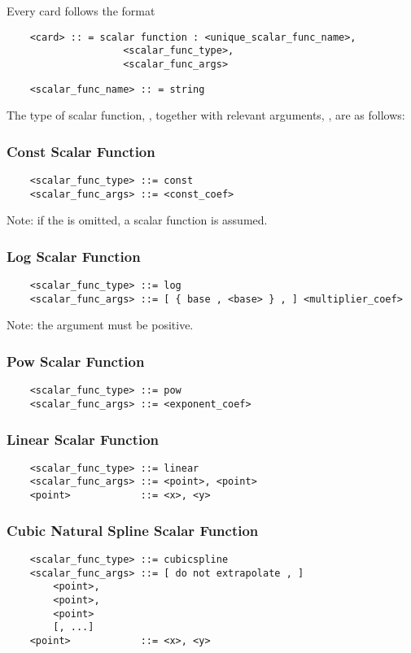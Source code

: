 \noindent
Every  card follows the format
\begin{verbatim}
    <card> :: = scalar function : <unique_scalar_func_name>, 
                    <scalar_func_type>,
                    <scalar_func_args>
\end{verbatim}
\begin{verbatim}
    <scalar_func_name> :: = string 
\end{verbatim}

\noindent
The type of scalar function,
, together 
with relevant arguments, ,
are as follows:
\subsubsection{Const Scalar Function}
\begin{verbatim}
    <scalar_func_type> ::= const
    <scalar_func_args> ::= <const_coef>
\end{verbatim}
Note: if the  is omitted,
a  scalar function is assumed.

\subsubsection{Log Scalar Function}
\begin{verbatim}
    <scalar_func_type> ::= log
    <scalar_func_args> ::= [ { base , <base> } , ] <multiplier_coef>
\end{verbatim}
Note: the argument must be positive.

\subsubsection{Pow Scalar Function}
\begin{verbatim}
    <scalar_func_type> ::= pow
    <scalar_func_args> ::= <exponent_coef>
\end{verbatim}

\subsubsection{Linear Scalar Function}
\begin{verbatim}
    <scalar_func_type> ::= linear
    <scalar_func_args> ::= <point>, <point>
    <point>            ::= <x>, <y>
\end{verbatim}

\subsubsection{Cubic Natural Spline Scalar Function}
\begin{verbatim}
    <scalar_func_type> ::= cubicspline
    <scalar_func_args> ::= [ do not extrapolate , ]
        <point>, 
        <point>, 
        <point>
        [, ...]
    <point>            ::= <x>, <y>
\end{verbatim}

